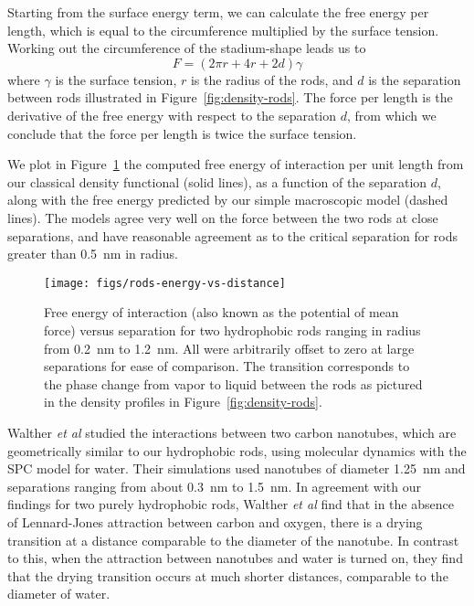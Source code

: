 \documentclass[twocolumn,amsmath,amssymb,prb]{revtex4-1}
\begin{document}
Starting from the surface energy term, we can calculate the 
free energy per length, which is equal to the circumference multiplied 
by the surface tension. 
Working out the circumference of the stadium-shape leads us to
\begin{equation}
F = (2\pi r +4r+2d)\gamma
\end{equation}
where $\gamma$ is the surface tension, $r$ is the radius of the rods,
and $d$ is the separation between rods illustrated in
Figure~\ref{fig:density-rods}.  The force per length is the derivative
of the free energy with respect to the separation $d$, from which we
conclude that the force per length is twice the
surface tension.

We plot in Figure~\ref{fig:rods-energy-vs-distance} the computed free
energy of interaction
per unit length from our classical density functional (solid lines),
as a function of the separation $d$, along with the free energy
predicted by our simple macroscopic model (dashed lines).  The models
agree very well on the force between the two rods at close
separations, and have reasonable agreement as to the critical
separation for rods greater than 0.5~nm in radius.

\begin{figure}
\begin{center}
\texttt{[image: figs/rods-energy-vs-distance]}
\end{center}
\caption{ Free energy of interaction (also known as the potential of mean force)
versus separation for two hydrophobic rods ranging in radius from
0.2~nm to 1.2~nm.
All were arbitrarily offset to zero at large separations for ease of comparison. The
transition corresponds to the phase change from
vapor to liquid between the rods as pictured in the density profiles in 
Figure~\ref{fig:density-rods}. }
\label{fig:rods-energy-vs-distance}
\end{figure}

Walther \emph{et al}\cite{walther2004hydrophobic} studied the
interactions between two carbon nanotubes, which are geometrically
similar to our hydrophobic rods, using molecular dynamics with the SPC
model for water.  Their simulations used nanotubes of diameter 1.25~nm
and separations ranging from about 0.3~nm to 1.5~nm.  In agreement
with our findings for two purely hydrophobic rods, Walther \emph{et
  al} find that in the absence of Lennard-Jones attraction between
carbon and oxygen, there is a drying transition at a distance
comparable to the diameter of the nanotube.  In contrast to this, when
the attraction between nanotubes and water is turned on, they find
that the drying transition occurs at much shorter distances,
comparable to the diameter of water.
\end{document}
